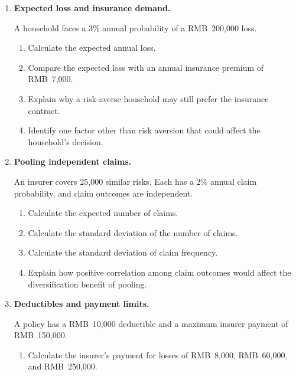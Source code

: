 \begin{enumerate}

\item \textbf{Expected loss and insurance demand.}

A household faces a 3\% annual probability of a RMB~200,000 loss.

\begin{enumerate}

\item Calculate the expected annual loss.

\item Compare the expected loss with an annual insurance premium of RMB~7,000.

\item Explain why a risk-averse household may still prefer the insurance contract.

\item Identify one factor other than risk aversion that could affect the household's decision.

\end{enumerate}

\item \textbf{Pooling independent claims.}

An insurer covers 25,000 similar risks. Each has a 2\% annual claim probability, and claim outcomes are independent.

\begin{enumerate}

\item Calculate the expected number of claims.

\item Calculate the standard deviation of the number of claims.

\item Calculate the standard deviation of claim frequency.

\item Explain how positive correlation among claim outcomes would affect the diversification benefit of pooling.

\end{enumerate}

\item \textbf{Deductibles and payment limits.}

A policy has a RMB~10,000 deductible and a maximum insurer payment of RMB~150,000.

\begin{enumerate}

\item Calculate the insurer's payment for losses of RMB~8,000, RMB~60,000, and RMB~250,000.


\end{enumerate}
\end{enumerate}
